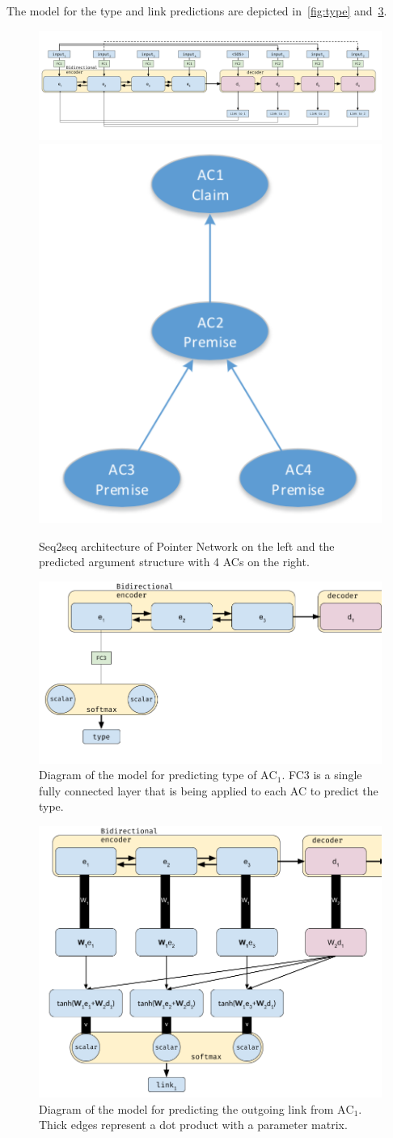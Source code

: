 \documentclass[onecolumn]{article}
\begin{document}
The model for the type and link predictions are depicted in~\autoref{fig:type} and~\ref{fig:link}.

\begin{figure}[h]
    \centering
    \includegraphics[width=0.8\linewidth]{fig/seq2seq.png}
    \includegraphics[width=0.18\linewidth]{fig/acs.png}
    \caption{Seq2seq architecture of Pointer Network on the left and the predicted argument structure with 4 ACs on the right.}\label{fig:seq2seq}
\end{figure}

\begin{figure}[h]
    \centering
    \includegraphics[width=0.8\linewidth]{fig/type.png}
    \caption{Diagram of the model for predicting type of $\text{AC}_1$. FC3 is a single fully connected layer that is being applied to each AC to predict the type.}\label{fig:type}
\end{figure}

\begin{figure}[h]
    \centering
    \includegraphics[width=0.8\linewidth]{fig/link.png}
    \caption{Diagram of the model for predicting the outgoing link from $\text{AC}_1$. Thick edges represent a dot product with a parameter matrix.}\label{fig:link}
\end{figure}
\end{document}
